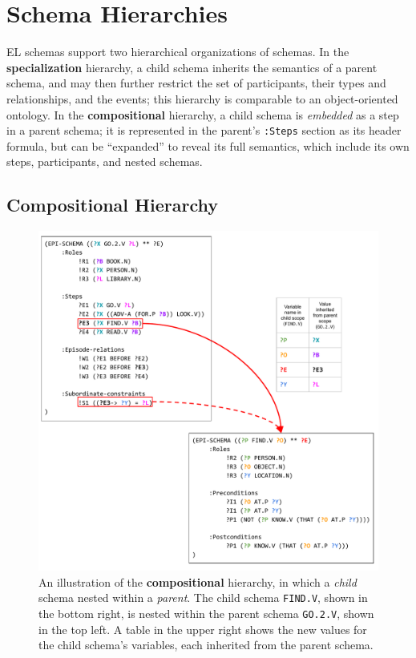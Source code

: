 \section{Schema Hierarchies}

EL schemas support two hierarchical organizations of schemas.
In the \textbf{specialization} hierarchy, a child schema inherits the semantics of a parent schema, and may then further restrict the set of participants, their types and relationships, and the events; this hierarchy is comparable to an object-oriented ontology.
In the \textbf{compositional} hierarchy, a child schema is \textit{embedded} as a step in a parent schema; it is represented in the parent's \texttt{:Steps} section as its header formula, but can be ``expanded'' to reveal its full semantics, which include its own steps, participants, and nested schemas.

\subsection{Compositional Hierarchy}
\begin{figure}
    \centering
    \includegraphics[width=\columnwidth]{CH3_schemas/nesting}
    \caption{An illustration of the \textbf{compositional} hierarchy, in which a \textit{child} schema nested within a \textit{parent}. The child schema \texttt{FIND.V}, shown in the bottom right, is nested within the parent schema \texttt{GO.2.V}, shown in the top left. A table in the upper right shows the new values for the child schema's variables, each inherited from the parent schema.}
    \label{fig:compo_hier}
\end{figure}

